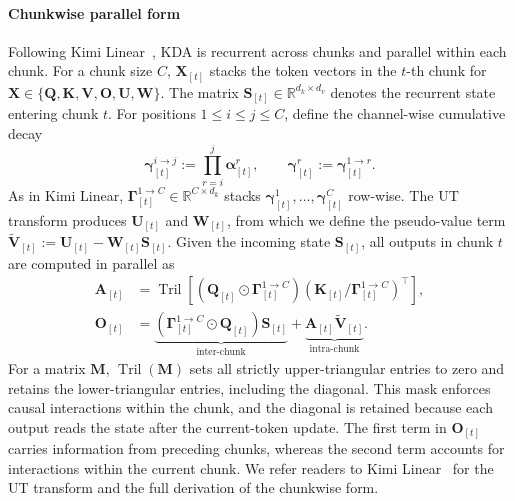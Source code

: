 \paragraph{Chunkwise parallel form}
Following Kimi Linear~\citep{team2025kimi}, KDA is recurrent across chunks and parallel within each chunk.
For a chunk size $C$, $\mathbf{X}_{[t]}$ stacks the token vectors in the $t$-th chunk for $\mathbf{X}\in\{\mathbf{Q},\mathbf{K},\mathbf{V},\mathbf{O},\mathbf{U},\mathbf{W}\}$.
The matrix $\mathbf{S}_{[t]}\in\mathbb{R}^{d_k\times d_v}$ denotes the recurrent state entering chunk $t$.
For positions $1\le i\le j\le C$, define the channel-wise cumulative decay
\begin{equation}
    \bm{\gamma}_{[t]}^{i\rightarrow j}
    := \prod_{r=i}^{j}\bm{\alpha}_{[t]}^r,
    \qquad
    \bm{\gamma}_{[t]}^r
    := \bm{\gamma}_{[t]}^{1\rightarrow r}.
    \label{eq:kda-cumulative-decay}
\end{equation}
As in Kimi Linear, $\bm{\Gamma}_{[t]}^{1\rightarrow C}\in\mathbb{R}^{C\times d_k}$ stacks $\bm{\gamma}_{[t]}^1,\ldots,\bm{\gamma}_{[t]}^C$ row-wise.
The UT transform produces $\mathbf{U}_{[t]}$ and $\mathbf{W}_{[t]}$, from which we define the pseudo-value term $\widetilde{\mathbf{V}}_{[t]}:=\mathbf{U}_{[t]}-\mathbf{W}_{[t]}\mathbf{S}_{[t]}$.
Given the incoming state $\mathbf{S}_{[t]}$, all outputs in chunk $t$ are computed in parallel as
\begin{align}
    \mathbf{A}_{[t]}
     & = \operatorname{Tril}\!\left[
                                  (\mathbf{Q}_{[t]}\odot \bm{\Gamma}_{[t]}^{1\rightarrow C})
                                  (\mathbf{K}_{[t]}/\bm{\Gamma}_{[t]}^{1\rightarrow C})^{\top}
                                  \right], \nonumber                        \\
    \mathbf{O}_{[t]}
     & = \underbrace{(\bm{\Gamma}_{[t]}^{1\rightarrow C}\odot\mathbf{Q}_{[t]})\mathbf{S}_{[t]}}_{\text{inter-chunk}}
    + \underbrace{\mathbf{A}_{[t]}\widetilde{\mathbf{V}}_{[t]}}_{\text{intra-chunk}}.
    \label{eq:kda-chunkwise}
\end{align}
For a matrix $\mathbf{M}$, $\operatorname{Tril}(\mathbf{M})$ sets all strictly upper-triangular entries to zero and retains the lower-triangular entries, including the diagonal.
This mask enforces causal interactions within the chunk, and the diagonal is retained because each output reads the state after the current-token update.
The first term in $\mathbf{O}_{[t]}$ carries information from preceding chunks, whereas the second term accounts for interactions within the current chunk.
We refer readers to Kimi Linear~\citep{team2025kimi} for the UT transform and the full derivation of the chunkwise form.

